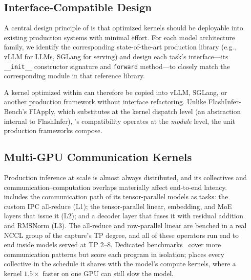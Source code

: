 \subsection{Interface-Compatible Design}
\label{sec:interface}

A central design principle of \fastkernels{} is that optimized kernels should be deployable into existing production systems with minimal effort.
For each model architecture family, we identify the corresponding state-of-the-art production library (e.g., vLLM for LLMs, SGLang for serving) and design each task's interface---its \texttt{\_\_init\_\_} constructor signature and \texttt{forward} method---to closely match the corresponding module in that reference library.

A kernel optimized within \fastkernels{} can therefore be copied into vLLM, SGLang, or another production framework without interface refactoring.
Unlike FlashInfer-Bench's FIApply, which substitutes at the kernel dispatch level (an abstraction internal to FlashInfer), \fastkernels{}'s compatibility operates at the \emph{module} level, the unit production frameworks compose.

\subsection{Multi-GPU Communication Kernels}
\label{sec:multigpu}

Production inference at scale is almost always distributed, and its collectives and communication--computation overlaps materially affect end-to-end latency.
\fastkernels{} includes the communication path of its tensor-parallel models as tasks: the custom IPC all-reduce (L1); the tensor-parallel linear, embedding, and MoE layers that issue it (L2); and a decoder layer that fuses it with residual addition and RMSNorm (L3).
The all-reduce and row-parallel linear are benched in a real NCCL group of the capture's TP degree, and all of these operators run end to end inside models served at TP 2--8.
Dedicated benchmarks~\citep{commbench,parallelkernelbench} cover more communication patterns but score each program in isolation; \fastkernels{} places every collective in the schedule it shares with the model's compute kernels, where a kernel $1.5\times$ faster on one GPU can still slow the model.
